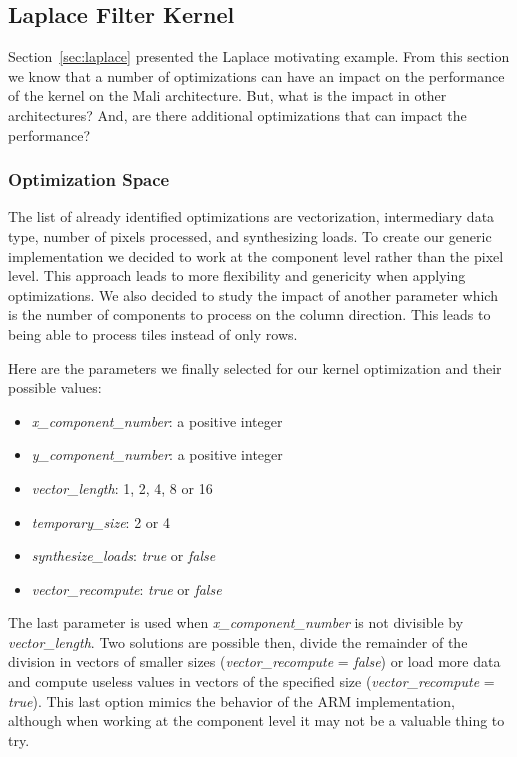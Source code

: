 \documentclass{IEEEtran}
\begin{document}
  \subsection{Laplace Filter Kernel}

Section~\ref{sec:laplace} presented the Laplace motivating example. From this
section we know that a number of optimizations can have an impact on the
performance of the kernel on the Mali architecture. But, what is the impact in
other architectures? And, are there additional optimizations that can impact
the performance?

    \subsubsection{Optimization Space}

The list of already identified optimizations are vectorization, intermediary
data type, number of pixels processed, and synthesizing loads.  To create our
generic implementation we decided to work at the component level rather than the
pixel level. This approach leads to more flexibility and genericity when
applying optimizations. We also decided to study the impact of another parameter
which is the number of components to process on the column direction. This leads
to being able to process tiles instead of only rows.

Here are the parameters we finally selected for our kernel optimization and
their possible values:
\begin{itemize}
\item \emph{x\_component\_number}: a positive integer
\item \emph{y\_component\_number}: a positive integer
\item \emph{vector\_length}: 1, 2, 4, 8 or 16
\item \emph{temporary\_size}: 2 or 4
\item \emph{synthesize\_loads}: \emph{true} or \emph{false}
\item \emph{vector\_recompute}: \emph{true} or \emph{false}
\end{itemize}
The last parameter is used when \emph{x\_component\_number} is not divisible by
\emph{vector\_length}. Two solutions are possible then, divide the remainder
of the division in vectors of smaller sizes (\emph{vector\_recompute} =
\emph{false}) or load more data and compute useless values in vectors of the
specified size (\emph{vector\_recompute} = \emph{true}).
This last option mimics the behavior of the ARM implementation, although when
working at the component level it may not be a valuable thing to try.
\end{document}
